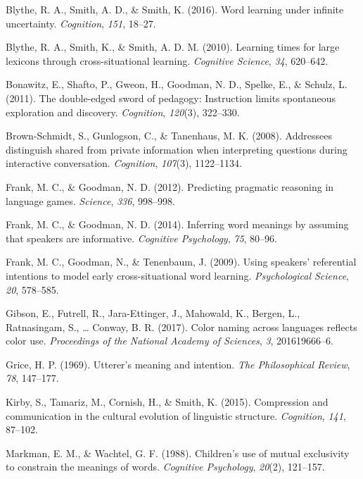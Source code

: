 \documentclass[english,,man,floatsintext]{apa6}
\begin{document}
\leavevmode\hypertarget{ref-blythe2016}{}%
Blythe, R. A., Smith, A. D., \& Smith, K. (2016). Word learning under infinite uncertainty. \emph{Cognition}, \emph{151}, 18--27.

\leavevmode\hypertarget{ref-blythe2010}{}%
Blythe, R. A., Smith, K., \& Smith, A. D. M. (2010). Learning times for large lexicons through cross-situational learning. \emph{Cognitive Science}, \emph{34}, 620--642.

\leavevmode\hypertarget{ref-bonawitz2011}{}%
Bonawitz, E., Shafto, P., Gweon, H., Goodman, N. D., Spelke, E., \& Schulz, L. (2011). The double-edged sword of pedagogy: Instruction limits spontaneous exploration and discovery. \emph{Cognition}, \emph{120}(3), 322--330.

\leavevmode\hypertarget{ref-brown-schmidt2008}{}%
Brown-Schmidt, S., Gunlogson, C., \& Tanenhaus, M. K. (2008). Addressees distinguish shared from private information when interpreting questions during interactive conversation. \emph{Cognition}, \emph{107}(3), 1122--1134.

\leavevmode\hypertarget{ref-frank2012}{}%
Frank, M. C., \& Goodman, N. D. (2012). Predicting pragmatic reasoning in language games. \emph{Science}, \emph{336}, 998--998.

\leavevmode\hypertarget{ref-frank2014}{}%
Frank, M. C., \& Goodman, N. D. (2014). Inferring word meanings by assuming that speakers are informative. \emph{Cognitive Psychology}, \emph{75}, 80--96.

\leavevmode\hypertarget{ref-frank2009}{}%
Frank, M. C., Goodman, N., \& Tenenbaum, J. (2009). Using speakers' referential intentions to model early cross-situational word learning. \emph{Psychological Science}, \emph{20}, 578--585.

\leavevmode\hypertarget{ref-gibson2017}{}%
Gibson, E., Futrell, R., Jara-Ettinger, J., Mahowald, K., Bergen, L., Ratnasingam, S., \ldots{} Conway, B. R. (2017). Color naming across languages reflects color use. \emph{Proceedings of the National Academy of Sciences}, \emph{3}, 201619666--6.

\leavevmode\hypertarget{ref-grice1969}{}%
Grice, H. P. (1969). Utterer's meaning and intention. \emph{The Philosophical Review}, \emph{78}, 147--177.

\leavevmode\hypertarget{ref-kirby2015}{}%
Kirby, S., Tamariz, M., Cornish, H., \& Smith, K. (2015). Compression and communication in the cultural evolution of linguistic structure. \emph{Cognition}, \emph{141}, 87--102.

\leavevmode\hypertarget{ref-markman1988}{}%
Markman, E. M., \& Wachtel, G. F. (1988). Children's use of mutual exclusivity to constrain the meanings of words. \emph{Cognitive Psychology}, \emph{20}(2), 121--157.
\end{document}
